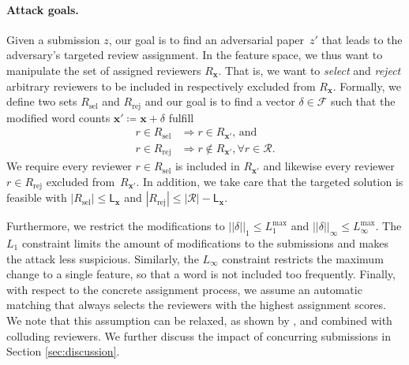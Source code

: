 \documentclass[letterpaper,twocolumn,10pt]{article}
\newcommand{\bow}{\textbf{x}}
\newcommand{\submission}{\bow}
\newcommand{\reviewersset}{\mathcal{R}}
\newcommand{\reviewersubset}{R}
\newcommand{\reviewer}{r}
\newcommand{\paperload}{\mathsf{L}_{\submission}}
\newcommand{\select}{\text{sel}}
\newcommand{\reject}{\text{rej}}
\newcommand{\requestedreviewers}{\reviewersubset_{\select}}
\newcommand{\rejectedreviewers}{\reviewersubset_{\reject}}
\newcommand{\modifications}{\delta}
\newcommand{\modificationsmannorm}{{\left| \left| \modifications \right| \right|}_1}
\newcommand{\modificationsinfnorm}{{\left| \left| \modifications \right| \right|}_\infty}
\newcommand{\maxmannorm}{L_1^\text{max}}
\newcommand{\maxinfnorm}{L_\infty^\text{max}}
\newcommand{\F}{\ensuremath{\mathcal{F}}\xspace}
\newcommand{\inputpdf}{\ensuremath{z}\xspace}
\begin{document}
\paragraph{Attack goals.}
Given a submission $\inputpdf$, our goal is to find an adversarial paper~$\inputpdf'$ that leads to the adversary's targeted review assignment. In the feature space, we thus want to manipulate the set of assigned reviewers $\reviewersubset_\submission$. That is, we want to \emph{select} and \emph{reject} arbitrary reviewers to be included in respectively excluded from $\reviewersubset_\submission$. Formally, we define two sets $\requestedreviewers$ and $\rejectedreviewers$ and our goal is to find a vector $\modifications \in \F$ such that the modified word counts $\submission' \coloneqq \submission + \modifications$ fulfill
\begin{equation}
\label{eq:feature-space-attack-goal}
\begin{split}
    \reviewer \in \requestedreviewers & \Rightarrow r \in \reviewersubset_{\submission'} \text{, and} \\
    r \in \rejectedreviewers & \Rightarrow r \notin \reviewersubset_{\submission'} , \forall \reviewer \in \reviewersset .
\end{split}
\end{equation}
We require every reviewer $\reviewer \in \requestedreviewers$ is included in $\reviewersubset_{\submission'}$ and likewise every reviewer $\reviewer \in \rejectedreviewers$ excluded from~$\reviewersubset_{\submission'}$. 
In addition, we take care that the targeted solution is feasible with $ \left| \requestedreviewers \right| \leq \paperload$ and $ \left| \rejectedreviewers \right|  \leq \left| \reviewersset  \right| - \paperload$.

Furthermore, we restrict the modifications to $\modificationsmannorm \leq \maxmannorm$ and $\modificationsinfnorm \leq \maxinfnorm$. The $L_1$ constraint limits the amount of modifications to the submissions and makes the attack less suspicious. Similarly, the $L_\infty$ constraint restricts the maximum change to a single feature, so that a word is not included too frequently. 
Finally, with respect to the concrete assignment process, we assume an automatic matching that always selects the reviewers with the highest assignment scores. We note that this assumption can be relaxed, as shown by \citet{jecmen-20-mitigating}, and combined with colluding reviewers. We further discuss the impact of concurring submissions in Section \ref{sec:discussion}.
\end{document}
